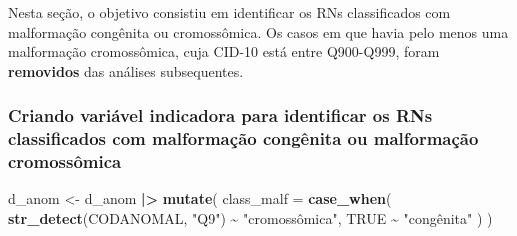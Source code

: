 \documentclass[
]{article}
\newenvironment{Shaded}{\begin{snugshade}}{\end{snugshade}}
\newcommand{\AttributeTok}[1]{\textcolor[rgb]{0.13,0.29,0.53}{#1}}
\newcommand{\ConstantTok}[1]{\textcolor[rgb]{0.56,0.35,0.01}{#1}}
\newcommand{\DecValTok}[1]{\textcolor[rgb]{0.00,0.00,0.81}{#1}}
\newcommand{\FunctionTok}[1]{\textcolor[rgb]{0.13,0.29,0.53}{\textbf{#1}}}
\newcommand{\NormalTok}[1]{#1}
\newcommand{\OtherTok}[1]{\textcolor[rgb]{0.56,0.35,0.01}{#1}}
\newcommand{\SpecialCharTok}[1]{\textcolor[rgb]{0.81,0.36,0.00}{\textbf{#1}}}
\newcommand{\StringTok}[1]{\textcolor[rgb]{0.31,0.60,0.02}{#1}}
\begin{document}
Nesta seção, o objetivo consistiu em identificar os RNs classificados
com malformação congênita ou cromossômica. Os casos em que havia pelo
menos uma malformação cromossômica, cuja CID-10 está entre Q900-Q999,
foram \textbf{removidos} das análises subsequentes.

\hypertarget{criando-variuxe1vel-indicadora-para-identificar-os-rns-classificados-com-malformauxe7uxe3o-conguxeanita-ou-malformauxe7uxe3o-cromossuxf4mica}{%
\subsubsection{Criando variável indicadora para identificar os RNs
classificados com malformação congênita ou malformação
cromossômica}\label{criando-variuxe1vel-indicadora-para-identificar-os-rns-classificados-com-malformauxe7uxe3o-conguxeanita-ou-malformauxe7uxe3o-cromossuxf4mica}}

\begin{Shaded}
\begin{Highlighting}[]
\NormalTok{d\_anom }\OtherTok{\textless{}{-}}\NormalTok{ d\_anom }\SpecialCharTok{|\textgreater{}}
  \FunctionTok{mutate}\NormalTok{(}
    \AttributeTok{class\_malf =} \FunctionTok{case\_when}\NormalTok{(}
    \FunctionTok{str\_detect}\NormalTok{(CODANOMAL, }\StringTok{"Q9"}\NormalTok{) }\SpecialCharTok{\textasciitilde{}} \StringTok{"cromossômica"}\NormalTok{,}
    \ConstantTok{TRUE} \SpecialCharTok{\textasciitilde{}} \StringTok{"congênita"}
\NormalTok{   )}
\NormalTok{ )}
\end{Highlighting}
\end{Shaded}

\begin{Shaded}
\end{Shaded}
\end{document}
